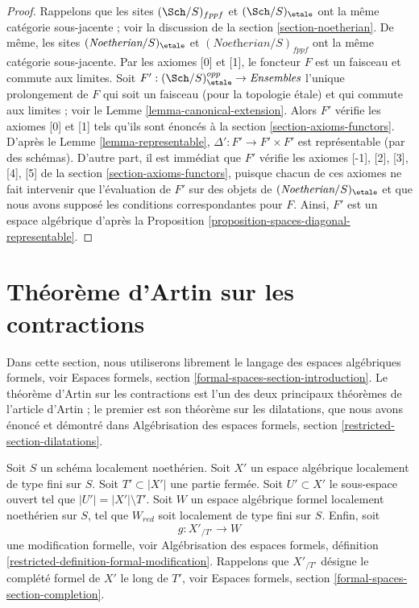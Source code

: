 \begin{proof}
Rappelons que les sites $(\Sch/S)_{fppf}$ et $(\Sch/S)_\etale$ ont la même
catégorie sous-jacente ; voir la discussion de la section \ref{section-noetherian}.
De même, les sites $(\textit{Noetherian}/S)_\etale$ et
$(\textit{Noetherian}/S)_{fppf}$ ont la même catégorie sous-jacente.
Par les axiomes [0] et [1], le foncteur $F$ est un faisceau et
commute aux limites.
Soit $F' : (\Sch/S)_\etale^{opp} \to \textit{Ensembles}$
l'unique prolongement de $F$ qui soit un faisceau (pour la topologie \'etale)
et qui commute aux limites ; voir le
Lemme \ref{lemma-canonical-extension}.
Alors $F'$ vérifie les axiomes [0] et [1] tels qu'ils sont énoncés à la
section \ref{section-axioms-functors}.
D'après le Lemme \ref{lemma-representable},
$\Delta' : F' \to F' \times F'$ est représentable (par des schémas).
D'autre part, il est immédiat que
$F'$ vérifie les axiomes [-1], [2], [3], [4], [5] de la
section \ref{section-axioms-functors},
puisque chacun de ces axiomes ne fait intervenir que l'évaluation de $F'$ sur des objets
de $(\textit{Noetherian}/S)_\etale$ et que nous avons supposé les
conditions correspondantes pour $F$.
Ainsi, $F'$ est un espace algébrique d'après la
Proposition \ref{proposition-spaces-diagonal-representable}.
\end{proof}












\section{Théorème d'Artin sur les contractions}
\label{section-contractions}

\noindent
Dans cette section, nous utiliserons librement le langage des espaces algébriques
formels, voir Espaces formels, section \ref{formal-spaces-section-introduction}.
Le théorème d'Artin sur les contractions est l'un des deux principaux théorèmes de
l'article d'Artin \cite{ArtinII} ; le premier est son théorème sur les dilatations,
que nous avons énoncé et démontré dans Algébrisation des espaces formels,
section \ref{restricted-section-dilatations}.

\begin{situation}
\label{situation-contractions}
Soit $S$ un schéma localement noethérien. Soit $X'$ un espace algébrique
localement de type fini sur $S$. Soit $T' \subset |X'|$ une partie
fermée. Soit $U' \subset X'$ le sous-espace ouvert tel que
$|U'| = |X'| \setminus T'$. Soit $W$ un espace algébrique formel
localement noethérien sur $S$, tel que $W_{red}$ soit localement de type fini
sur $S$. Enfin, soit
$$
g : X'_{/T'} \longrightarrow W
$$
une modification formelle, voir
Algébrisation des espaces formels, définition
\ref{restricted-definition-formal-modification}.
Rappelons que $X'_{/T'}$ désigne le complété formel de $X'$ le long de
$T'$, voir Espaces formels, section \ref{formal-spaces-section-completion}.
\end{situation}


